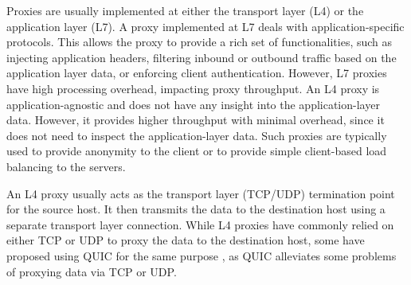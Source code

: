 Proxies are usually implemented at either the transport layer (L4) or the application layer (L7).
A proxy implemented at L7 deals with application-specific protocols.
This allows the proxy to provide a rich set of functionalities, such as injecting application headers, filtering inbound or outbound traffic based on the application layer data, or enforcing client authentication.
However, L7 proxies have high processing overhead, impacting proxy throughput.
An L4 proxy is application-agnostic and does not have any insight into the application-layer data.
However, it provides higher throughput with minimal overhead, since it does not need to inspect the application-layer data.
Such proxies are typically used to provide anonymity to the client or to provide simple client-based load balancing to the servers.

An L4 proxy usually acts as the transport layer (TCP/UDP) termination point for the source host.
It then transmits the data to the destination host using a separate transport layer connection.
While L4 proxies have commonly relied on either TCP or UDP to proxy the data to the destination host, some have proposed using QUIC for the same purpose \cite{quic_masque}, as QUIC alleviates some problems of proxying data via TCP or UDP.
